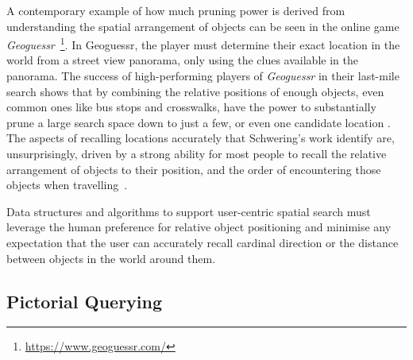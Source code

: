 % 
\par{A contemporary example of how much pruning power is derived from understanding the spatial arrangement of objects can be seen in the online game \textit{Geoguessr}~\footnote{\href{https://www.geoguessr.com/}{https://www.geoguessr.com/}}.
In Geoguessr, the player must determine their exact location in the world from a street view panorama, only using the clues available in the panorama. 
The success of high-performing players of \textit{Geoguessr} in their last-mile search shows that by combining the relative positions of enough objects, even common ones like bus stops and crosswalks, have the power to substantially prune a large search space down to just a few, or even one candidate location \cite{BernersLee2023}.
The aspects of recalling locations accurately that Schwering's work identify are, unsurprisingly, driven by a strong ability for most people to recall the relative arrangement of objects to their position, and the order of encountering those objects when travelling~\cite{Schwering2014}.}
\par{Data structures and algorithms to support user-centric spatial search must leverage the human preference for relative object positioning and minimise any expectation that the user can accurately recall cardinal direction or the distance between objects in the world around them.}



\subsection{Pictorial Querying}

